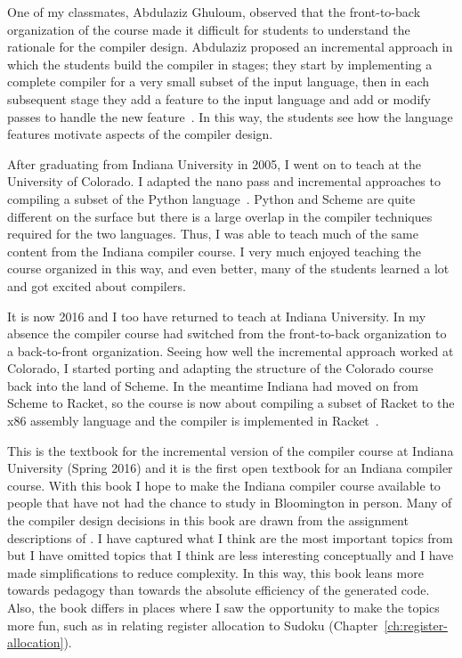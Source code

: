 \documentclass[11pt]{book}
\begin{document}
One of my classmates, Abdulaziz Ghuloum, observed that the
front-to-back organization of the course made it difficult for
students to understand the rationale for the compiler
design. Abdulaziz proposed an incremental approach in which the
students build the compiler in stages; they start by implementing a
complete compiler for a very small subset of the input language, then
in each subsequent stage they add a feature to the input language and
add or modify passes to handle the new feature~\citep{Ghuloum:2006bh}.
In this way, the students see how the language features motivate
aspects of the compiler design.

After graduating from Indiana University in 2005, I went on to teach
at the University of Colorado. I adapted the nano pass and incremental
approaches to compiling a subset of the Python
language~\citep{Siek:2012ab}.  Python and Scheme are quite different
on the surface but there is a large overlap in the compiler techniques
required for the two languages. Thus, I was able to teach much of the
same content from the Indiana compiler course. I very much enjoyed
teaching the course organized in this way, and even better, many of
the students learned a lot and got excited about compilers.

It is now 2016 and I too have returned to teach at Indiana University.
In my absence the compiler course had switched from the front-to-back
organization to a back-to-front organization. Seeing how well the
incremental approach worked at Colorado, I started porting and
adapting the structure of the Colorado course back into the land of
Scheme. In the meantime Indiana had moved on from Scheme to Racket, so
the course is now about compiling a subset of Racket to the x86
assembly language and the compiler is implemented in
Racket~\citep{plt-tr}.

This is the textbook for the incremental version of the compiler
course at Indiana University (Spring 2016) and it is the first
open textbook for an Indiana compiler course.  With this book I hope to
make the Indiana compiler course available to people that have not had
the chance to study in Bloomington in person.  Many of the compiler
design decisions in this book are drawn from the assignment
descriptions of \cite{Dybvig:2010aa}. I have captured what I think are
the most important topics from \cite{Dybvig:2010aa} but I have omitted
topics that I think are less interesting conceptually and I have made
simplifications to reduce complexity.  In this way, this book leans
more towards pedagogy than towards the absolute efficiency of the
generated code. Also, the book differs in places where I saw the
opportunity to make the topics more fun, such as in relating register
allocation to Sudoku (Chapter~\ref{ch:register-allocation}).
\end{document}
